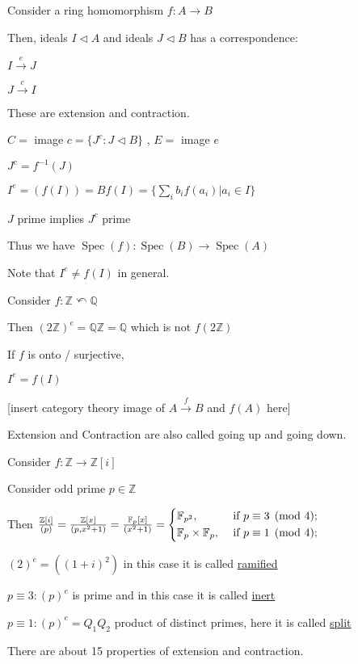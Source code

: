\documentclass{article}
\theoremstyle{definition}
\begin{document}
Consider a ring homomorphism \(f:A\to B\)

Then, ideals \(I\triangleleft A\) and ideals \(J\triangleleft B\) has a correspondence:

\(I \overset{e}{\to} J\) 

\(J \overset{c}{\to} I\) 

These are extension and contraction.

\(C =\) image \(c=\{ J^c : J\triangleleft B \} \) , \(E=\) image \(e\) 

\(J^c = f^{-1}(J)\) 

\(I^e = (f(I)) = Bf(I) = \{ \sum_{i} b_i f(a_i) | a_i\in I \} \) 

\(J\) prime implies \(J^c\) prime

Thus we have \(\operatorname{Spec}(f) : \operatorname{Spec}(B) \to \operatorname{Spec}(A) \) 

Note that \(I^e \neq f(I)\) in general.

Consider \(f:\mathbb{Z} \curvearrowleft \mathbb{Q}\) 

Then \((2\mathbb{Z})^e = \mathbb{Q}\mathbb{Z}=\mathbb{Q}\) which is not \(f(2\mathbb{Z})\)  

If \(f\) is onto / surjective,

\(I^e = f(I)\) 

[insert category theory image of \(A \overset{f}{\to} B\) and \(f(A)\) here]

Extension and Contraction are also called going up and going down.

Consider \(f:\mathbb{Z} \to\mathbb{Z} [i]\) 

Consider odd prime \(p\in\mathbb{Z}\) 

Then \(\frac{\mathbb{Z}[i]}{(p)}=\frac{\mathbb{Z}[x]}{(p,x^2 + 1)}=\frac{\mathbb{F}_p[x]}{(x^2 + 1)}=\begin{dcases}
    \mathbb{F} _{p^2}, &\text{ if } p\equiv 3\pmod 4 ;\\
    \mathbb{F} _p\times\mathbb{F} _p, &\text{ if } p\equiv 1\pmod 4 ;\\
\end{dcases}\) 

\((2)^e = ((1+i)^2)\) in this case it is called \underline{ramified}

\(p\equiv 3: (p)^e\) is prime and in this case it is called \underline{inert}

\(p\equiv 1: (p)^e = Q_1 Q_2\) product of distinct primes, here it is called \underline{split}

There are about 15 properties of extension and contraction.
\end{document}
